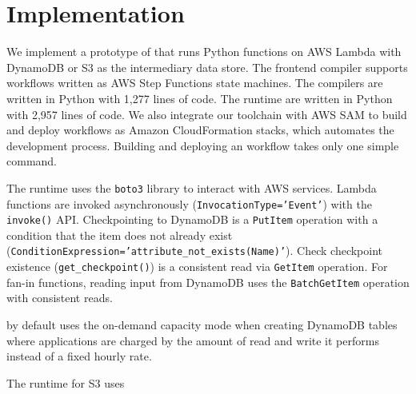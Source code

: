 \section{Implementation}\label{sec:impl}

We implement a prototype of \name{} that runs Python functions on AWS Lambda
with DynamoDB or S3 as the intermediary data store. The frontend compiler
supports workflows written as AWS Step Functions state machines. The compilers
are written in Python with 1,277 lines of code. The runtime are written in
Python with 2,957 lines of code. We also integrate our toolchain with AWS SAM
to build and deploy \name{} workflows as Amazon CloudFormation stacks, which
automates the development process. Building and deploying an \name{} workflow
takes only one simple command.

The runtime uses the \texttt{boto3} library to interact with AWS services.
Lambda functions are invoked asynchronously (\texttt{InvocationType='Event'})
with the \texttt{invoke()} API. Checkpointing to DynamoDB is a
\texttt{PutItem} operation with a condition that the item does not already
exist (\texttt{ConditionExpression='attribute_not_exists(Name)'}). Check
checkpoint existence (\texttt{get_checkpoint()}) is a consistent read via
\texttt{GetItem} operation. For fan-in functions, reading input from DynamoDB
uses the \texttt{BatchGetItem} operation with consistent reads.

\name{} by default uses the on-demand capacity mode when creating DynamoDB
tables where applications are charged by the amount of read and write it
performs instead of a fixed hourly rate.

The runtime for S3 uses \texttt{}